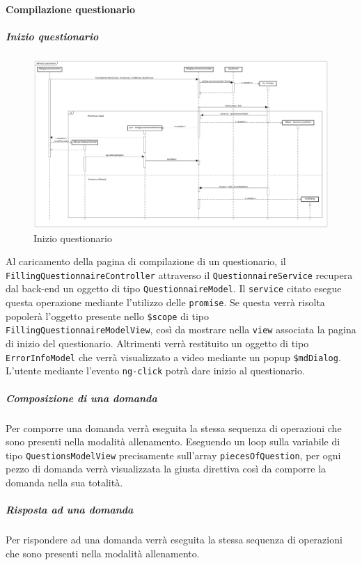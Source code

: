 \paragraph{Compilazione questionario}

\subparagraph{Inizio questionario}

\label{Inizio questionario}

\begin{figure}[ht]
	\centering
	\includegraphics[scale=0.20,keepaspectratio]{UML/DiagrammiDiSequenza/Front-end/Quiz_start.png}
	\caption{Inizio questionario}
\end{figure} \FloatBarrier

Al caricamento della pagina di compilazione di un questionario, il \texttt{FillingQuestionnaireController} attraverso il \texttt{QuestionnaireService} recupera dal back-end un oggetto di tipo \texttt{QuestionnaireModel}. Il \texttt{service} citato esegue questa operazione mediante l'utilizzo delle \texttt{promise}. Se questa verrà risolta popolerà l'oggetto presente nello \texttt{\$scope} di tipo \texttt{FillingQuestionnaireModelView}, così da mostrare nella \texttt{view} associata la pagina di inizio del questionario. Altrimenti verrà restituito un oggetto di tipo \texttt{ErrorInfoModel} che verrà visualizzato a video mediante un popup \texttt{\$mdDialog}. \\
L'utente mediante l'evento \texttt{ng-click} potrà dare inizio al questionario. 

\subparagraph{Composizione di una domanda}

Per comporre una domanda verrà eseguita la stessa sequenza di operazioni che sono presenti nella modalità allenamento. Eseguendo un loop sulla variabile di tipo \texttt{QuestionsModelView} precisamente sull'array \texttt{piecesOfQuestion}, per ogni pezzo di domanda verrà visualizzata la giusta direttiva così da comporre la domanda nella sua totalità.

\subparagraph{Risposta ad una domanda}

Per rispondere ad una domanda verrà eseguita la stessa sequenza di operazioni che sono presenti nella modalità allenamento.


